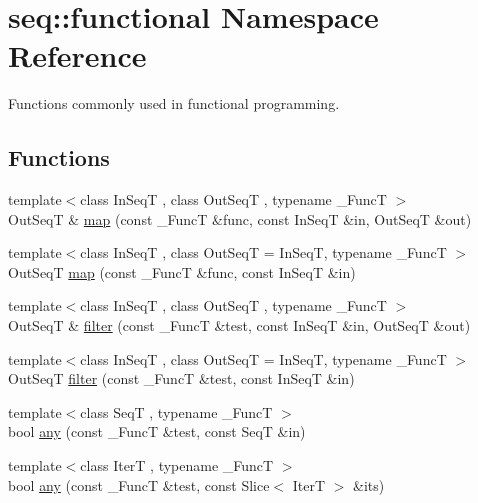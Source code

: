 \hypertarget{namespaceseq_1_1functional}{\section{seq\-:\-:functional Namespace Reference}
\label{namespaceseq_1_1functional}
}


Functions commonly used in functional programming.  


\subsection*{Functions}
\begin{DoxyCompactItemize}
\item 
{\footnotesize template$<$class In\-Seq\-T , class Out\-Seq\-T , typename \-\_\-\-Func\-T $>$ }\\Out\-Seq\-T \& \hyperlink{namespaceseq_1_1functional_ad36a538cd982a860de04e7f4af03bc4c}{map} (const \-\_\-\-Func\-T \&func, const In\-Seq\-T \&in, Out\-Seq\-T \&out)
\item 
{\footnotesize template$<$class In\-Seq\-T , class Out\-Seq\-T  = In\-Seq\-T, typename \-\_\-\-Func\-T $>$ }\\Out\-Seq\-T \hyperlink{namespaceseq_1_1functional_ab95c352080a36fe07cb04fe95b95caf8}{map} (const \-\_\-\-Func\-T \&func, const In\-Seq\-T \&in)
\item 
{\footnotesize template$<$class In\-Seq\-T , class Out\-Seq\-T , typename \-\_\-\-Func\-T $>$ }\\Out\-Seq\-T \& \hyperlink{namespaceseq_1_1functional_a5054f153ed880f89b744eec7aab118cf}{filter} (const \-\_\-\-Func\-T \&test, const In\-Seq\-T \&in, Out\-Seq\-T \&out)
\item 
{\footnotesize template$<$class In\-Seq\-T , class Out\-Seq\-T  = In\-Seq\-T, typename \-\_\-\-Func\-T $>$ }\\Out\-Seq\-T \hyperlink{namespaceseq_1_1functional_af3c889426da274197c74d0ec794072ff}{filter} (const \-\_\-\-Func\-T \&test, const In\-Seq\-T \&in)
\item 
{\footnotesize template$<$class Seq\-T , typename \-\_\-\-Func\-T $>$ }\\bool \hyperlink{namespaceseq_1_1functional_aadc273f6584110ccd147c612a2c315ab}{any} (const \-\_\-\-Func\-T \&test, const Seq\-T \&in)
\item 
{\footnotesize template$<$class Iter\-T , typename \-\_\-\-Func\-T $>$ }\\bool \hyperlink{namespaceseq_1_1functional_af131c7ae7d3ef6731a5e1fb71a8177aa}{any} (const \-\_\-\-Func\-T \&test, const Slice$<$ Iter\-T $>$ \&its)

\end{DoxyCompactItemize}
